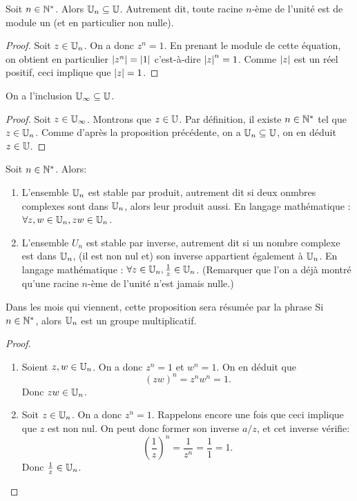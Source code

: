\begin{proposition}
Soit $n\in\mathbb{N}^*$. Alors $\mathbb{U}_n \subseteq \mathbb{U}$. Autrement dit, toute racine $n$-ème de l'unité est de module un (et en particulier non nulle).
\end{proposition}
\begin{proof}
Soit $z\in\mathbb{U}_n$. On a donc $z^n=1$. En prenant le module de cette équation, on obtient en particulier $\left\lvert z^n\right\rvert=\left\lvert1\right\rvert$ c'est-à-dire $\left\lvert z\right\rvert^n=1$. Comme $\left\lvert z\right\rvert$ est un réel positif, ceci implique que $\left\lvert z\right\rvert=1$.
\end{proof}

\begin{corollaire}
On a l'inclusion $\mathbb{U}_\infty\subseteq\mathbb{U}$.
\end{corollaire}
\begin{proof}
Soit $z\in \mathbb{U}_\infty$. Montrons que $z\in\mathbb{U}$. Par définition, il existe $n\in\mathbb{N}^*$ tel que $z\in\mathbb{U}_n$. Comme d'après la proposition précédente, on a $\mathbb{U}_n\subseteq \mathbb{U}$, on en déduit $z\in\mathbb{U}$. 
\end{proof}

\begin{proposition}
Soit $n\in\mathbb{N}^*$. Alors:
\begin{enumerate}
\item L'ensemble $\mathbb{U}_n$ est stable par produit, autrement dit si deux onmbres complexes sont dans $\mathbb{U}_n$, alors leur produit aussi. En langage mathématique : $\forall z, w\in\mathbb{U}_n, zw\in\mathbb{U}_n$.
\item L'ensemble $U_n$ est stable par inverse, autrement dit si un nombre complexe est dans $\mathbb{U}_n$, (il est non nul et) son inverse appartient également à $\mathbb{U}_n$. En langage mathématique : $\forall z\in\mathbb{U}_n, \frac{1}{z} \in\mathbb{U}_n$. (Remarquer que l'on a déjà montré qu'une racine $n$-ème de l'unité n'est jamais nulle.)
\end{enumerate}
\end{proposition}
\begin{remarque}
Dans les mois qui viennent, cette proposition sera résumée par la phrase \og Si $n\in\mathbb{N}^*$, alors $\mathbb{U}_n$ est un groupe multiplicatif.\fg
\end{remarque}

\begin{proof}
\begin{enumerate}
\item Soient $z, w\in\mathbb{U}_n$. On a donc $z^n=1$ et $w^n=1$. On en déduit que 
\[ (zw)^n=z^nw^n=1.\]
Donc $zw\in\mathbb{U}_n$.
\item Soit $z\in\mathbb{U}_n$. On a donc $z^n=1$. Rappelons encore une fois que ceci implique que $z$ est non nul. On peut donc former son inverse $a/z$, et cet inverse vérifie:
\[ \left(\frac{1}{z}\right)^n = \frac{1}{z^n} = \frac{1}{1} = 1.\]
Donc $\frac{1}{z} \in\mathbb{U}_n$.
\end{enumerate}
\end{proof}

